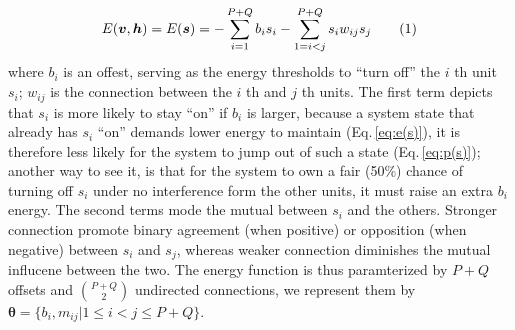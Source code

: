 \documentclass[11pt]{article}
\newcommand\numberthis{\addtocounter{equation}{1}\tag{\theequation}}
\newcommand{\vh}{\boldsymbol{h}}
\newcommand{\vv}{\boldsymbol{v}}
\newcommand{\vs}{\boldsymbol{s}}
\newcommand{\pEC}{\boldsymbol{\theta}}
\begin{document}
\begin{align*}\label{eq:e(s)} %
    E(\vv, \vh) = E(\vs) = -\sum_{i=1}^{P+Q} b_i s_i - \sum_{1 = i < j}^{P+Q} s_i w_{ij} s_j \numberthis
\end{align*}
where $b_i$ is an offest, serving as the energy thresholds to ``turn off'' the $i$ th unit $s_i$; $w_{ij}$ is the connection between the $i$ th and $j$ th units. The first term depicts that $s_i$ is more likely to stay ``on'' if $b_i$ is larger, because a system state that already has $s_i$ ``on'' demands lower energy to maintain (Eq.\,\ref{eq:e(s)}), it is therefore less likely for the system to jump out of such a state (Eq.\,\ref{eq:p(s)}); another way to see it, is that for the system to own a fair (50\%) chance of turning off $s_i$ under no interference form the other units, it must raise an extra $b_i$ energy. The second terms mode the mutual between $s_i$ and the others. Stronger connection promote binary agreement (when positive) or opposition (when negative) between $s_i$ and $s_j$, whereas weaker connection diminishes the mutual influcene between the two. The energy function is thus paramterized by $P+Q$ offsets and $P+Q \choose 2$ undirected connections, we represent them by $\pEC = \{b_i, m_{ij} | 1 \le i < j \le P+Q\}$.
\end{document}

